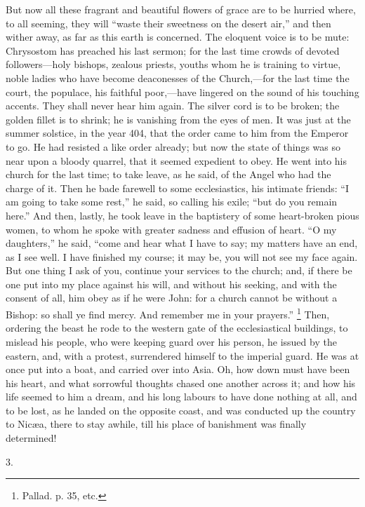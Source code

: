 But now all these fragrant and beautiful flowers of grace are to be
hurried where, to all seeming, they will ``waste their sweetness
on the desert air,'' and then wither away, as far as this earth is
concerned. The eloquent voice is to be mute: Chrysostom has preached
his last sermon; for the last time crowds of devoted followers—holy
bishops, zealous priests, youths whom he is training to virtue, noble
ladies who have become deaconesses of the Church,—for the last time
the court, the populace, his faithful poor,—have lingered on the
sound of his touching accents. They shall never hear him again. The
silver cord is to be broken; the golden fillet is to shrink; he is
vanishing from the eyes of men. It was just at the summer solstice, in
the year 404, that the order came to him from the Emperor to go. He
had resisted a like order already; but now the state of things was so
near upon a bloody quarrel, that it seemed expedient to obey. He went
into his church for the last time; to take leave, as he said, of the
Angel who had the charge of it. Then he bade farewell to some
ecclesiastics, his intimate friends: ``I am going to take some
rest,'' he said, so calling his exile; ``but do you remain
here.'' And then, lastly, he took leave in the baptistery of some
heart-broken pious women, to whom he spoke with greater sadness and
effusion of heart. ``O my daughters,'' he said, ``come and
hear what I have to say; my matters have an end, as I see well. I have
finished my course; it may be, you will not see my face again. But one
thing I ask of you, continue your services to the church; and, if
there be one put into my place against his will, and without his
seeking, and with the consent of all, him obey as if he were John: for
a church cannot be without a Bishop: so shall ye find mercy. And
remember me in your prayers.'' \footnote{Pallad. p. 35, etc.} Then, ordering the beast he rode to the western gate of the
ecclesiastical buildings, to mislead his people, who were keeping
guard over his person, he issued by the eastern, and, with a protest,
surrendered himself to the imperial guard. He was at once put into a
boat, and carried over into Asia. Oh, how down must have been his
heart, and what sorrowful thoughts chased one another across it; and
how his life seemed to him a dream, and his long labours to have done
nothing at all, and to be lost, as he landed on the opposite coast,
and was conducted up the country to Nicæa, there to stay awhile, till
his place of banishment was finally determined!

3.


